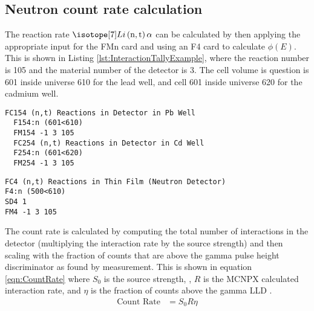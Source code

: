 \documentclass[draftcls,onecolumn]{IEEEtran}
\begin{document}
\subsection{Neutron count rate calculation}
The reaction rate $\iso[7]{Li}\left(\text{n},\text{t}\right)\alpha$ can be calculated by then applying the appropriate input for the FMn card and using an F4 card to calculate $\phi(E)$.
This is shown in Listing \ref{lst:InteractionTallyExample}, where the reaction number is 105 and the material number of the detector is 3.
The cell volume is question is 601 inside universe 610 for the lead well, and cell 601 inside universe 620 for the cadmium well.
\begin{lstlisting}[caption={[Lead and Cadmium Well ${}^{6}\text{Li}\left(\text{n},\text{t}\right)\alpha$ Reaction Rate]Lead and Cadmium Well ${}^{6}\text{Li}\left(\text{n},\text{t}\right)\alpha$ Reaction Rates. The lead well is 154, and the cadmium well is 254},label={lst:InteractionTallyExample}]
  FC154 (n,t) Reactions in Detector in Pb Well
  F154:n (601<610)
  FM154 -1 3 105
  FC254 (n,t) Reactions in Detector in Cd Well
  F254:n (601<620)
  FM254 -1 3 105
\end{lstlisting}


\begin{lstlisting}[caption={[RPM8 ${}^{6}\text{Li}\left(\text{n},\text{t}\right)\alpha$ Reaction Rate]RPM8 ${}^{6}\text{Li}\left(\text{n},\text{t}\right)\alpha$ Reaction Rate. The detector is all of the layers of cell 500 inside universe 610. This tally is multiplied by an SD card to normalize by the volume},label={lst:InteractionRateRMP}]
FC4 (n,t) Reactions in Thin Film (Neutron Detector)
F4:n (500<610)
SD4 1
FM4 -1 3 105
\end{lstlisting}

The count rate is calculated by computing the total number of interactions in the detector (multiplying the interaction rate by the source strength) and then scaling with the fraction of counts that are above the gamma pulse height discriminator as found by measurement.
This is shown in equation \eqref{eqn:CountRate} where $S_0$ is the source strength, , $R$ is the MCNPX calculated interaction rate, and $\eta$ is the fraction of counts above the gamma LLD .
\begin{align}
 \label{eqn:CountRate}
 \text{Count Rate} &= S_0 R \eta
\end{align}

\pagebreak
\end{document}
